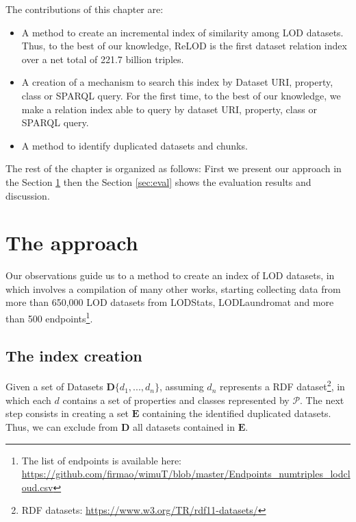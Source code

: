 The contributions of this chapter are:
\begin{itemize}
    \item A method to create an incremental index of similarity among LOD datasets. Thus, to the best of our knowledge, ReLOD is the first dataset relation index over a net total of 221.7 billion triples.
    \item A creation of a mechanism to search this index by Dataset URI, property, class or SPARQL query. For the first time, to the best of our knowledge, we make a relation index able to query by dataset URI, property, class or SPARQL query.
    \item A method to identify duplicated datasets and chunks.
\end{itemize}

The rest of the chapter is organized as follows:
First we present our approach in the Section \ref{sec:approach} then the Section \ref{sec:eval} shows the evaluation results and discussion.

\section{The approach}
\label{sec:approach}
Our observations guide us to a method to create an index of LOD datasets, in which involves a compilation of many other works, starting collecting data from more than 650,000 LOD datasets from LODStats, LODLaundromat and more than 500 endpoints\footnote{The list of endpoints is available here: \url{https://github.com/firmao/wimuT/blob/master/Endpoints_numtriples_lodcloud.csv}}. 


\subsection{The index creation}
\label{sec:indexCreation}

Given a set of Datasets $\mathbf{D}\{d_1,...,d_n\}$, assuming $d_n$ represents a RDF dataset\footnote{RDF datasets: \url{https://www.w3.org/TR/rdf11-datasets/}}, in which each $d$ contains a set of properties and classes represented by $\mathcal{P}$. The next step consists in creating a set $\mathbf{E}$ containing the identified duplicated datasets. Thus, we can exclude from $\mathbf{D}$ all datasets contained in $\mathbf{E}$.

